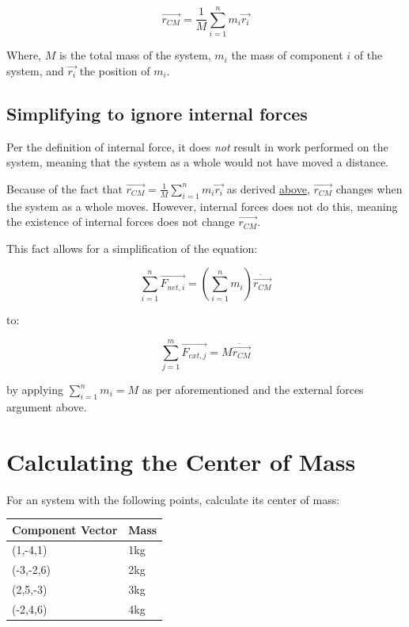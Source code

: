 \documentclass[letterpaper]{article}
\begin{document}
\begin{equation}
\vec{r_{CM}} = \frac{1}{M} \sum^n_{i=1} m_i \vec{r_i}
\end{equation}

Where, \(M\) is the total mass of the system, \(m_i\) the mass of component \(i\) of the system, and \(\vec{r_i}\) the position of \(m_i\).

\subsection{Simplifying to ignore internal forces}
\label{sec:orgb2359db}
Per the definition of internal force, it does \emph{not} result in work performed on the system, meaning that the system as a whole would not have moved a distance.

Because of the fact that \(\vec{r_{CM}} = \frac{1}{M} \sum^n_{i=1} m_i \vec{r_i}\) as derived \hyperref[sec:org348a133]{above}, \(\vec{r_{CM}}\) changes when the system as a whole moves. However, internal forces does not do this, meaning the existence of internal forces does not change \(\vec{r_{CM}}\).

This fact allows for a simplification of the equation:

\begin{equation}
\sum^n_{i=1} \vec{F_{net,i}} = (\sum^n_{i=1} m_i) \ddot{\vec{r_{CM}}}
\end{equation}

to:

\begin{equation}
\sum^m_{j=1} \vec{F_{ext,j}} = M \ddot{\vec{r_{CM}}}
\end{equation}

by applying  \(\sum^n_{i=1} m_i = M\) as per aforementioned and the external forces argument above.

\section{Calculating the Center of Mass}
\label{sec:orgffde5f8}
For an system with the following points, calculate its center of mass:

\begin{center}
\begin{tabular}{ll}
Component Vector & Mass\\
\hline
(1,-4,1) & 1kg\\
(-3,-2,6) & 2kg\\
(2,5,-3) & 3kg\\
(-2,4,6) & 4kg\\
\end{tabular}
\end{center}
\end{document}

